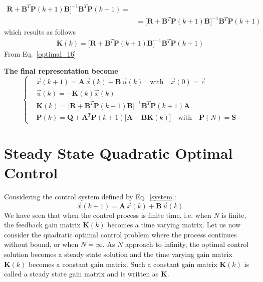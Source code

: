 \documentclass[12pt,a4paper,oneside]{book}
\begin{document}
\begin{onehalfspace}
\begin{equation}
\begin{aligned}
		\mathbf{R}+\mathbf{B}^T\mathbf{P}(k+1)\mathbf{B}\Big]^{-1}\mathbf{B}^T\mathbf{P}(k+1)=
		\\[6pt]
		&=\Big[ 
		\mathbf{R}+\mathbf{B}^T\mathbf{P}(k+1)\mathbf{B}\Big]^{-1}\mathbf{B}^T\mathbf{P}(k+1)
	\end{aligned}
\end{equation}
which results as follows
\begin{equation}\label{optimal_16}
	\begin{aligned}
		\mathbf{K}(k)=\Big[ 
		\mathbf{R}+\mathbf{B}^T\mathbf{P}(k+1)\mathbf{B}\Big]^{-1}\mathbf{B}^T\mathbf{P}(k+1)
	\end{aligned}
\end{equation}
From Eq.~\eqref{optimal_16}
\begin{mybox}
	\noindent \textbf{The final representation become} 
	\begin{equation}\label{optimal_final}
		\left\lbrace \begin{aligned}
			& \vec{x}(k+1)=\mathbf{A}\,\vec{x}(k)+\mathbf{B}\,\vec{u}(k) \quad 
			\text{with} \quad \vec{x}(0) = \vec{c} \\[6pt]
			& \vec{u}(k) = -\mathbf{K}(k)\vec{x}(k) \\[6pt]
			& \mathbf{K}(k) = \Big[
			\mathbf{R}+\mathbf{B}^T\mathbf{P}(k+1)\mathbf{B}\Big]^{-1}\mathbf{B}^T\mathbf{P}(k+1)
			\mathbf{A} \\[6pt]
			& \mathbf{P}(k) =\mathbf{Q}+\mathbf{A}^T\mathbf{P}(k+1)\Big[ 
			\mathbf{A} -\mathbf{B}\mathbf{K}(k)\Big] \quad \text{with} \quad 
			\mathbf{P}(N) =\mathbf{S}
		\end{aligned}\right. 
	\end{equation}
\end{mybox}

\section{Steady State Quadratic Optimal Control}
Considering the control system defined by Eq.~\eqref{system}:
\begin{equation}\label{optimal_control_ss_eq1}
	\vec{x}(k+1) = \mathbf{A}\,\vec{x}(k)+\mathbf{B}\,\vec{u}(k) 
\end{equation}
We have seen that when the control process is finite time, i.e. when $N$ is 
finite, the feedback gain matrix $\mathbf{K}(k)$ becomes a time varying matrix.
Let us now consider the quadratic optimal control problem where the process 
continues without bound, or when $N=\infty$. As $N$ approach to infinity, the 
optimal control solution becomes a steady state solution and the time varying 
gain matrix $\mathbf{K}(k)$ becomes a constant gain matrix. Such a constant 
gain matrix $\mathbf{K}(k)$ is called a steady state gain matrix and is written 
as $\mathbf{K}$. 


\end{onehalfspace}
\end{document}
